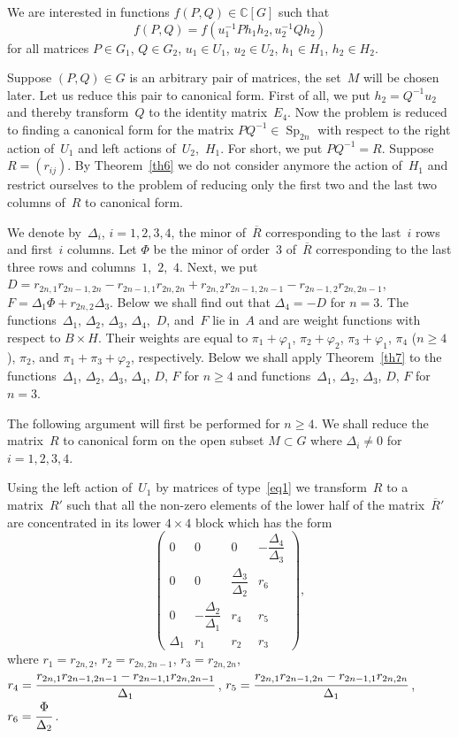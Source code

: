 \documentclass[12pt]{amsart}
\theoremstyle{definition}
\theoremstyle{remark}
\begin{document}
We are interested in functions $f(P,Q)\in \mathbb{C}[G]$ such that
$$
f(P,Q)=f(u_1^{-1}Ph_1h_2,u_2^{-1}Qh_2)
$$
for all matrices $P\in G_1$, $Q\in G_2$, $u_1\in U_1$, $u_2\in U_2$,
$h_1\in H_1$, $h_2\in H_2$.

Suppose $(P,Q)\in G$ is an arbitrary pair of matrices, the set~$M$
will be chosen later. Let us reduce this pair to canonical form.
First of all, we put $h_2=Q^{-1}u_2$ and thereby transform~$Q$ to
the identity matrix~$E_4$. Now the problem is reduced to finding a
canonical form for the matrix $PQ^{-1}\in{\operatorname{Sp}}_{2n}$ with respect to
the right action of~$U_1$ and left actions of~$U_2$,~$H_1$. For
short, we put $PQ^{-1}=R$. Suppose $R=(r_{ij})$. By
Theorem~\ref{th6} we do not consider anymore the action of~$H_1$ and
restrict ourselves to the problem of reducing only the first two and
the last two columns of~$R$ to canonical form.

We denote by~$\Delta_i$, $i=1,2,3,4$, the minor of~$\overline R$
corresponding to the last~$i$ rows and first~$i$ columns. Let $\Phi$
be the minor of order~3 of~$\overline R$ corresponding to the last
three rows and columns~$1$,~$2$,~$4$. Next, we put
$D=r_{2n,1}r_{2n-1,2n}-
r_{2n-1,1}r_{2n,2n}+r_{2n,2}r_{2n-1,2n-1}-r_{2n-1,2}r_{2n,2n-1}$,
$F=\Delta_1\Phi+r_{2n,2}\Delta_3$. Below we shall find out that
$\Delta_4=-D$ for $n=3$. The functions~$\Delta_1$, $\Delta_2$,
$\Delta_3$, $\Delta_4$,~$D$, and~$F$ lie in~$A$ and are weight
functions with respect to $B\times H$. Their weights are equal to
$\pi_1+\varphi_1$, $\pi_2+\varphi_2$, $\pi_3+\varphi_1$, $\pi_4$
($n{\geqslant}4$), $\pi_2$, and $\pi_1+\pi_3+\varphi_2$, respectively. Below
we shall apply Theorem~\ref{th7} to the functions~$\Delta_1$,
$\Delta_2$, $\Delta_3$, $\Delta_4$, $D$, $F$ for $n{\geqslant}4$ and
functions~$\Delta_1$, $\Delta_2$, $\Delta_3$, $D$, $F$ for $n=3$.

The following argument will first be performed for $n{\geqslant} 4$. We
shall reduce the matrix~$R$ to canonical form on the open subset
$M\subset G$ where $\Delta_i\ne0$ for $i=1,2,3,4$.

Using the left action of~$U_1$ by matrices of type~\eqref{eq1} we
transform~$R$ to a matrix~$R'$ such that all the non-zero elements
of the lower half of the matrix~$\overline R{}'$ are concentrated in
its lower $4\times 4$ block which has the form
$$
\begin{pmatrix}
0 & 0 & 0 & -\dfrac{\Delta_4}{\Delta_3}
\\
0 & 0 & \dfrac{\Delta_3}{\Delta_2} & r_6
\\
0 & -\dfrac{\Delta_2}{\Delta_1} & r_4 & r_5
\\
\Delta_1 & r_1 & r_2 & r_3
\end{pmatrix},
$$
where $r_1=r_{2n,2}$, $r_2=r_{2n,2n-1}$, $r_3=r_{2n,2n}$,
$r_4=\cfrac{r_{2n,1}r_{2n-1,2n-1}-r_{2n-1,1}r_{2n,2n-1}}{\Delta_1}$\,,
$r_5=\cfrac{r_{2n,1}r_{2n-1,2n}-r_{2n-1,1}r_{2n,2n}}{\Delta_1}$\,,
$r_6=\cfrac{\Phi}{\Delta_2}$\,.
\end{document}
